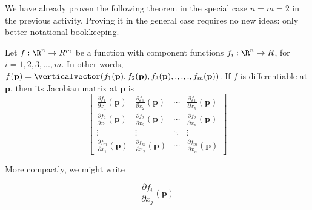 \documentclass{ximera}
\begin{document}
	We have already proven the following theorem in the special case $n=m=2$ in the previous activity.  Proving it in the general case requires no new ideas: 
	 only better notational bookkeeping.
	
	\begin{theorem}
		Let $f:\R^n \to R^m$ be a function with component functions $f_i:\R^n \to R$, for $i=1,2,3,...,m$.  In other words,
		$f(\mathbf{p}) = \verticalvector(f_1(\mathbf{p}),f_2(\mathbf{p}),f_3(\mathbf{p}),.,.,., f_m(\mathbf{p}))$.  If $f$ is differentiable at $\mathbf{p}$,
		 then its Jacobian matrix at $\mathbf{p}$ is 
                 \[
                 \begin{bmatrix}
                   \frac{\partial f_1}{\partial x_1} \left(\mathbf{p}\right) & \frac{\partial f_1}{\partial x_2} \left(\mathbf{p}\right) & \cdots & \frac{\partial f_1}{\partial x_n}\left(\mathbf{p}\right) \\
                   \frac{\partial f_2}{\partial x_1} \left(\mathbf{p}\right) & \frac{\partial f_2}{\partial x_2} \left(\mathbf{p}\right) & \cdots & \frac{\partial f_2}{\partial x_n}\left(\mathbf{p}\right) \\
                   \vdots                                                    & \vdots                                                    & \ddots & \vdots \\
                   \frac{\partial f_m}{\partial x_1} \left(\mathbf{p}\right) & \frac{\partial f_m}{\partial x_2} \left(\mathbf{p}\right) & \cdots & \frac{\partial f_m}{\partial x_n}\left(\mathbf{p}\right) 
                 \end{bmatrix}
                 \]
		  
		  More compactly, we might write
		  
		  \[
		  	\frac{\partial f_i}{\partial x_j} \left( \mathbf{p} \right)
		  \]
		  

	\end{theorem}
	
\end{document}

